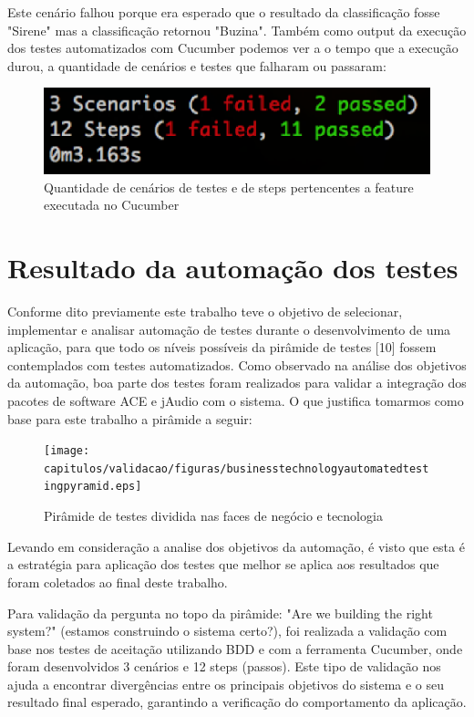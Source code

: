 Este cenário falhou porque era esperado que o resultado da classificação fosse "Sirene" mas a classificação retornou "Buzina". Também como output da execução dos testes automatizados com Cucumber podemos ver a o tempo que a execução durou, a quantidade de cenários e testes que falharam ou passaram:

\begin{figure}[H]
	\centering
	\captionsetup{justification=centering,margin=2cm}
	\includegraphics[scale=0.65]{capitulos/validacao/figuras/quantidadeDeErrosQpassaramOUn.eps}
	\caption{Quantidade de cenários de testes e de steps pertencentes a feature executada no Cucumber}
	\label{fig:result-engajamento}
\end{figure}

\section{Resultado da automação dos testes}
Conforme dito previamente este trabalho teve o objetivo de selecionar, implementar e analisar automação de testes durante o desenvolvimento de uma aplicação, para que todo os níveis possíveis da pirâmide de testes [10] fossem contemplados com testes automatizados. Como observado na análise dos objetivos da automação, boa parte dos testes foram realizados para validar a integração dos pacotes de software ACE e jAudio com o sistema. O que justifica tomarmos como base para este trabalho a pirâmide a seguir: 

\begin{figure}[H]
	\centering
	\captionsetup{justification=centering,margin=2cm}
	\texttt{[image: capitulos/validacao/figuras/businesstechnologyautomatedtestingpyramid.eps]}
	\caption{Pirâmide de testes dividida nas faces de negócio e tecnologia}
	\label{fig:result-engajamento}
\end{figure}

Levando em consideração a analise dos objetivos da automação, é visto que esta é a estratégia para aplicação dos testes que melhor se aplica aos resultados que foram coletados ao final deste trabalho.

Para validação da pergunta no topo da pirâmide: "Are we building the right system?" (estamos construindo o sistema certo?), foi realizada a validação com base nos testes de aceitação utilizando BDD e com a ferramenta Cucumber,  onde foram desenvolvidos 3 cenários e 12 steps (passos). Este tipo de validação nos ajuda a encontrar divergências entre os principais objetivos do sistema e o seu resultado final esperado, garantindo a verificação do comportamento da aplicação. 

